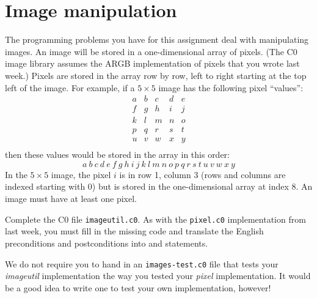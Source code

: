 \documentclass[12pt]{exam}
\begin{document}
\section{Image manipulation}

The programming problems you have for this assignment deal with
manipulating images. An image will be stored in a one-dimensional
array of pixels. (The C0 image library assumes the ARGB implementation
of pixels that you wrote last week.) Pixels are stored in the array
row by row, left to right starting at the top left of the image. For
example, if a $5 \times 5$ image has the following pixel ``values'':
$$
\begin{array}{ccccc}
a & b & c & d & e \\
f & g & h & i & j \\
k & l & m & n & o \\
p & q & r & s & t \\
u & v & w & x & y \\
\end{array}
$$
then these values would be stored in the array in this order:
$$
a\ b\ c\ d\ e\ f\ g\ h\ i\ j\ k\ l\ m\ n\ o\ p\ q\ r\ s\ t\ u\ v\ w\ x\ y
$$
In the $5 \times 5$ image, the pixel $i$ is in row 1, column 3 (rows
and columns are indexed starting with 0) but is stored in the one-dimensional
array at index 8. An image must have at least one pixel.

\begin{task}[4]
  Complete the C0 file \lstinline'imageutil.c0'. As with the
  \lstinline'pixel.c0' implementation from last week, you must fill in
  the missing code and translate the English preconditions and
  postconditions into \requires{} and \ensures{} statements.
\end{task}

We do not require you to hand in an \lstinline'images-test.c0' file
that tests your \emph{imageutil} implementation the way you tested
your \emph{pixel} implementation. It would be a good idea to write one
to test your own implementation, however!

\end{document}
